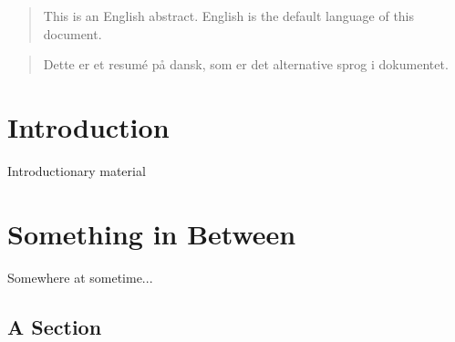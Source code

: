 \documentclass{ituthesis}
\begin{document}

\frontmatter

\thetitlepage
\newpage

\begin{abstract}
This is an English abstract. English is the default language of this document.
\end{abstract}

\begin{otherlanguage}{danish}
  \begin{abstract}
    Dette er et resumé på dansk, som er det alternative sprog i dokumentet.
  \end{abstract}
\end{otherlanguage}

\cleardoublepage
\setcounter{tocdepth}{1}
\tableofcontents

\mainmatter

\midsloppy
\sloppybottom

\chapter{Introduction}
Introductionary material

\chapter{Something in Between}
Somewhere at sometime...

\section{A Section}
\end{document}
